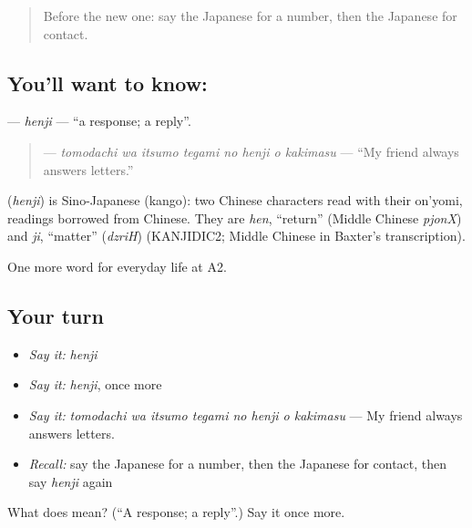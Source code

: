 \begin{quote}
Before the new one: say the Japanese for a number, then the Japanese for contact.
\end{quote}

\subsection*{You'll want to know: }
\textbf{} — \emph{henji} — \textquotedblleft{}a response; a reply\textquotedblright{}.

\begin{quote}
\textbf{    } — \emph{tomodachi wa itsumo tegami no henji o kakimasu} — \textquotedblleft{}My friend always answers letters.\textquotedblright{}
\end{quote}

\begin{cousinweb}
\textbf{} (\emph{henji}) is Sino-Japanese (kango): two Chinese characters read with their on'yomi, readings borrowed from Chinese. They are \emph{hen}, \textquotedblleft{}return\textquotedblright{} (Middle Chinese \emph{pjonX}) and \emph{ji}, \textquotedblleft{}matter\textquotedblright{} (\emph{dzriH}) (KANJIDIC2; Middle Chinese in Baxter's transcription).
\end{cousinweb}

\begin{grammarlens}[title={What you've built}]
One more word for everyday life at A2.
\end{grammarlens}

\subsection*{Your turn}
\begin{itemize}
\raggedright
  \item \emph{Say it:} \emph{henji}
  \item \emph{Say it:} \emph{henji}, once more
  \item \emph{Say it:} \emph{tomodachi wa itsumo tegami no henji o kakimasu} — My friend always answers letters.
  \item \emph{Recall:} say the Japanese for a number, then the Japanese for contact, then say \emph{henji} again
\end{itemize}

\begin{tcolorbox}[breakable,colback=teal!4,colframe=teal!35!black,title={Before you move on}]
What does  mean? (\textquotedblleft{}A response; a reply\textquotedblright{}.) Say it once more.
\end{tcolorbox}
